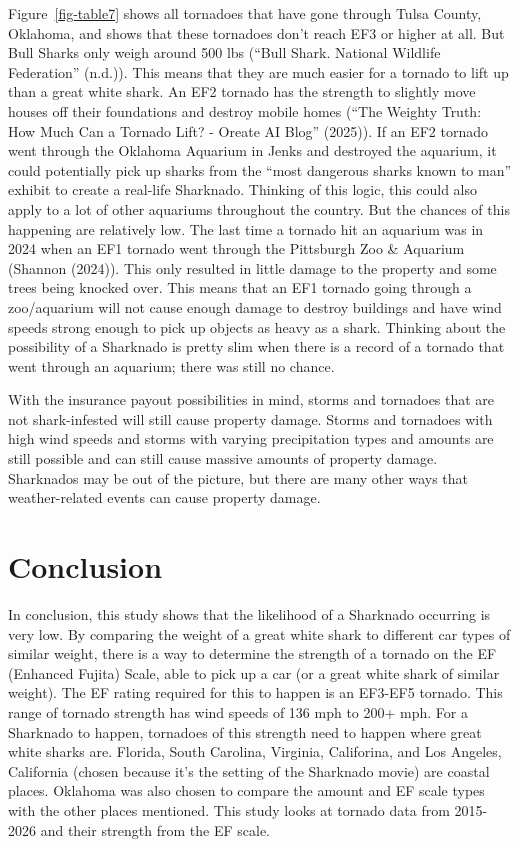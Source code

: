 \documentclass[
  letterpaper,
  DIV=11,
  numbers=noendperiod]{scrreprt}
\begin{document}
Figure~\ref{fig-table7} shows all tornadoes that have gone through Tulsa
County, Oklahoma, and shows that these tornadoes don't reach EF3 or
higher at all. But Bull Sharks only weigh around 500 lbs ({``Bull Shark.
National Wildlife Federation''} (n.d.)). This means that they are much
easier for a tornado to lift up than a great white shark. An EF2 tornado
has the strength to slightly move houses off their foundations and
destroy mobile homes ({``The Weighty Truth: How Much Can a Tornado Lift?
- Oreate {AI} Blog''} (2025)). If an EF2 tornado went through the
Oklahoma Aquarium in Jenks and destroyed the aquarium, it could
potentially pick up sharks from the ``most dangerous sharks known to
man'' exhibit to create a real-life Sharknado. Thinking of this logic,
this could also apply to a lot of other aquariums throughout the
country. But the chances of this happening are relatively low. The last
time a tornado hit an aquarium was in 2024 when an EF1 tornado went
through the Pittsburgh Zoo \& Aquarium (Shannon (2024)). This only
resulted in little damage to the property and some trees being knocked
over. This means that an EF1 tornado going through a zoo/aquarium will
not cause enough damage to destroy buildings and have wind speeds strong
enough to pick up objects as heavy as a shark. Thinking about the
possibility of a Sharknado is pretty slim when there is a record of a
tornado that went through an aquarium; there was still no chance.

With the insurance payout possibilities in mind, storms and tornadoes
that are not shark-infested will still cause property damage. Storms and
tornadoes with high wind speeds and storms with varying precipitation
types and amounts are still possible and can still cause massive amounts
of property damage. Sharknados may be out of the picture, but there are
many other ways that weather-related events can cause property damage.


\chapter{Conclusion}\label{conclusion}

In conclusion, this study shows that the likelihood of a Sharknado
occurring is very low. By comparing the weight of a great white shark to
different car types of similar weight, there is a way to determine the
strength of a tornado on the EF (Enhanced Fujita) Scale, able to pick up
a car (or a great white shark of similar weight). The EF rating required
for this to happen is an EF3-EF5 tornado. This range of tornado strength
has wind speeds of 136 mph to 200+ mph. For a Sharknado to happen,
tornadoes of this strength need to happen where great white sharks are.
Florida, South Carolina, Virginia, Califorina, and Los Angeles,
California (chosen because it's the setting of the Sharknado movie) are
coastal places. Oklahoma was also chosen to compare the amount and EF
scale types with the other places mentioned. This study looks at tornado
data from 2015-2026 and their strength from the EF scale.
\end{document}
